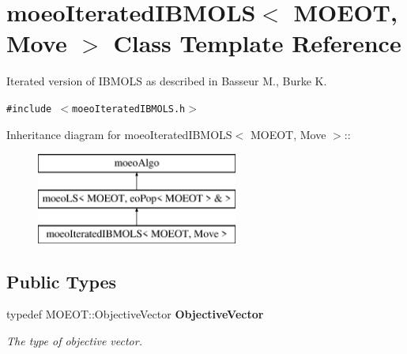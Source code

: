 \section{moeo\-Iterated\-IBMOLS$<$ MOEOT, Move $>$ Class Template Reference}
\label{classmoeoIteratedIBMOLS}
Iterated version of IBMOLS as described in Basseur M., Burke K.  


{\tt \#include $<$moeo\-Iterated\-IBMOLS.h$>$}

Inheritance diagram for moeo\-Iterated\-IBMOLS$<$ MOEOT, Move $>$::\begin{figure}[H]
\begin{center}
\leavevmode
\includegraphics[height=3cm]{classmoeoIteratedIBMOLS}
\end{center}
\end{figure}
\subsection*{Public Types}
\begin{CompactItemize}
\item 
typedef MOEOT::Objective\-Vector \bf{Objective\-Vector}\label{classmoeoIteratedIBMOLS_bc0f8dff81be56b23376995aace92a01}

\begin{CompactList}\small\item\em The type of objective vector. \item\end{CompactList}\end{CompactItemize}
